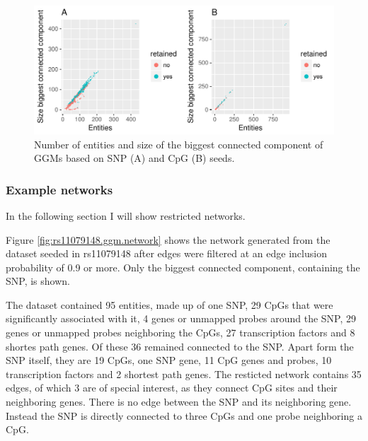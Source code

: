 \documentclass[a4paper,12pt,twoside,openright]{article}
\begin{document}
\begin{figure}[tb]
	\includegraphics[scale = 1, keepaspectratio = true]{../figures/hervS2_ggm_entity_cc_size_scatter}  
	\caption{Number of entities and size of the biggest connected component of GGMs based on SNP (A) and CpG (B) seeds.}
    \label{fig:ggm.entity.cc.scatter}
\end{figure}

\subsubsection{Example networks}
\label{Results:Example networks}
In the following section I will show restricted networks. 

Figure \ref{fig:rs11079148.ggm.network} shows the network generated from the dataset seeded in rs11079148 after edges were filtered at an edge inclusion probability of 0.9 or more. Only the biggest connected component, containing the SNP, is shown. 

The dataset contained 95 entities, made up of one SNP, 29 CpGs that were significantly associated with it, 4 genes or unmapped probes around the SNP, 29 genes or unmapped probes neighboring the CpGs, 27 transcription factors and 8 shortes path genes. Of these 36 remained connected to the SNP. Apart form the SNP itself, they are 19 CpGs, one SNP gene, 11 CpG genes and probes, 10 transcription factors and 2 shortest path genes. The resticted network contains 35 edges, of which 3 are of special interest, as they connect CpG sites and their neighboring genes. There is no edge between the SNP and its neighboring gene. Instead the SNP is directly connected to three CpGs and one probe neighboring a CpG. 
\end{document}
